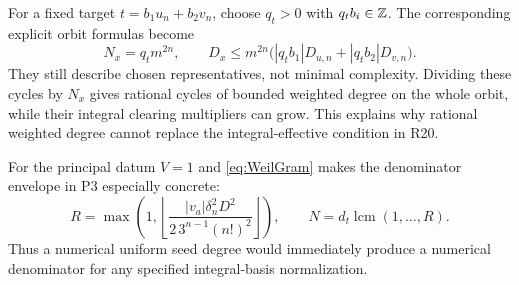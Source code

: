For a fixed target $t=b_1u_n+b_2v_n$, choose $q_t>0$ with $q_tb_i\in\mathbb Z$. The corresponding explicit orbit formulas become
\[
 N_x=q_tm^{2n},\qquad
 D_x\le m^{2n}\bigl(|q_tb_1|D_{u,n}+|q_tb_2|D_{v,n}\bigr).
\]
They still describe chosen representatives, not minimal complexity. Dividing these cycles by $N_x$ gives rational cycles of bounded weighted degree on the whole orbit, while their integral clearing multipliers can grow. This explains why rational weighted degree cannot replace the integral-effective condition in R20.

For the principal datum $V=1$ and \eqref{eq:WeilGram} makes the denominator envelope in P3 especially concrete:
\[
 R=\max\left(1,\left\lfloor
 \frac{|v_a|\delta_n^2D^2}{2\,3^{n-1}(n!)^2}
 \right\rfloor\right),\qquad
 N=d_t\operatorname{lcm}(1,\ldots,R).
\]
Thus a numerical uniform seed degree would immediately produce a numerical denominator for any specified integral-basis normalization.
